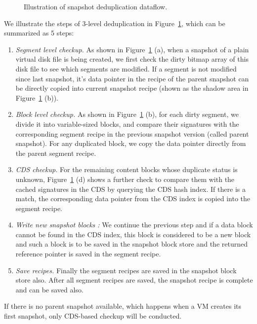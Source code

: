 %
\begin{figure}
  \centering
  \caption{Illustration of snapshot deduplication dataflow.}
  \label{fig:dedupflow}
\end{figure}

We illustrate the steps of 3-level deduplication in Figure~\ref{fig:dedupflow}, which can be summarized as 5 steps:
\begin{enumerate}
\item {\em Segment level checkup.}
As shown in Figure~\ref{fig:dedupflow} (a),
when  a snapshot of a plain virtual disk file is being created, we first check the dirty bitmap array of
this disk file  to see which segments are modified. If a segment is not modified since last snapshot, 
it's data pointer in the recipe of the  parent snapshot  can be directly copied into 
current snapshot recipe (shown as the shadow area in Figure~\ref{fig:dedupflow} (b)).

\item {\em Block level checkup.}
As shown in Figure~\ref{fig:dedupflow} (b),
for each dirty segment, we divide it into variable-sized blocks,
and compare their signatures with  the corresponding segment recipe in the previous snapshot version (called parent
snapshot). 
For any duplicated block, we copy the data pointer directly from the parent segment recipe. 
\item {\em CDS checkup.} For the remaining  content blocks whose duplicate status is unknown,
Figure~\ref{fig:dedupflow} (d)
shows  a further check to compare  them with  the cached signatures in the CDS by querying
the CDS hash index. If there is a match, the corresponding data pointer from the CDS index is
copied into the segment recipe. 
\item {\em Write new snapshot blocks :}
We continue the previous step and 
if a data block cannot be found in the CDS index, this block is considered to be a new block
and such a block is to be saved in the snapshot block store and  the returned reference  pointer is
saved in the  segment recipe.
\item {\em Save recipes.} Finally the  segment recipes are saved in the  snapshot block store also.
 After all segment recipes are saved, the snapshot recipe is complete and can be saved also.
\end{enumerate}

If there is no parent snapshot available, which happens when a VM creates its first snapshot, 
only CDS-based checkup will be conducted.
